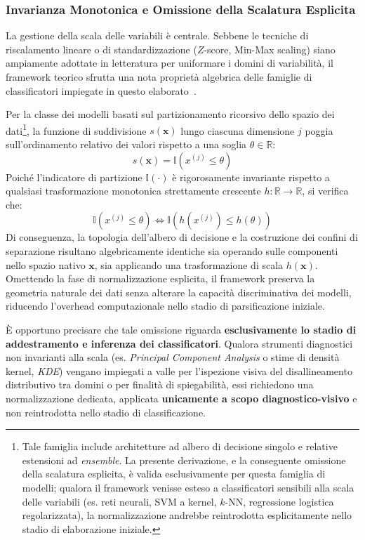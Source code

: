 \subsubsection{Invarianza Monotonica e Omissione della Scalatura Esplicita}
\label{subsubsec:invarianza_monotonica}
La gestione della scala delle variabili è centrale. Sebbene le tecniche di riscalamento lineare o di standardizzazione ($Z$-score, Min-Max scaling) siano ampiamente adottate in letteratura per uniformare i domini di variabilità, il framework teorico sfrutta una nota proprietà algebrica delle famiglie di classificatori impiegate in questo elaborato~\cite{breiman1984,hastie2009}.

Per la classe dei modelli basati sul partizionamento ricorsivo dello spazio dei dati\footnote{Tale famiglia include architetture ad albero di decisione singolo e relative estensioni ad \textit{ensemble}. La presente derivazione, e la conseguente omissione della scalatura esplicita, è valida esclusivamente per questa famiglia di modelli; qualora il framework venisse esteso a classificatori sensibili alla scala delle variabili (es. reti neurali, SVM a kernel, $k$-NN, regressione logistica regolarizzata), la normalizzazione andrebbe reintrodotta esplicitamente nello stadio di elaborazione iniziale.}, la funzione di suddivisione $s(\mathbf{x})$ lungo ciascuna dimensione $j$ poggia sull'ordinamento relativo dei valori rispetto a una soglia $\theta \in \mathbb{R}$:
\begin{equation}
    s(\mathbf{x}) = \mathbb{I}\left(x^{(j)} \le \theta\right)
\end{equation}
Poiché l'indicatore di partizione $\mathbb{I}(\cdot)$ è rigorosamente invariante rispetto a qualsiasi trasformazione monotonica strettamente crescente $h: \mathbb{R} \rightarrow \mathbb{R}$, si verifica che:
\begin{equation}
    \mathbb{I}\left(x^{(j)} \le \theta\right) \iff \mathbb{I}\left(h(x^{(j)}) \le h(\theta)\right)
\end{equation}
Di conseguenza, la topologia dell'albero di decisione e la costruzione dei confini di separazione risultano algebricamente identiche sia operando sulle componenti nello spazio nativo $\mathbf{x}$, sia applicando una trasformazione di scala $h(\mathbf{x})$. Omettendo la fase di normalizzazione esplicita, il framework preserva la geometria naturale dei dati senza alterare la capacità discriminativa dei modelli, riducendo l'overhead computazionale nello stadio di parsificazione iniziale.

\`E opportuno precisare che tale omissione riguarda \textbf{esclusivamente lo stadio di addestramento e inferenza dei classificatori}. Qualora strumenti diagnostici non invarianti alla scala (es. \textit{Principal Component Analysis} o stime di densità kernel, \textit{KDE}) vengano impiegati a valle per l'ispezione visiva del disallineamento distributivo tra domini o per finalità di spiegabilità, essi richiedono una normalizzazione dedicata, applicata \textbf{unicamente a scopo diagnostico-visivo} e non reintrodotta nello stadio di classificazione.

